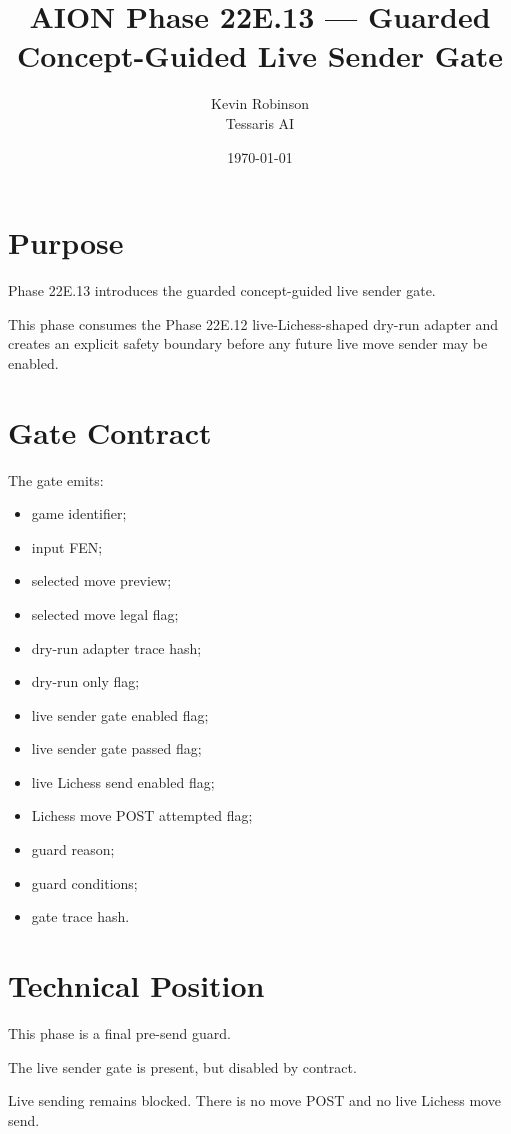 \documentclass[11pt,a4paper]{article}
\title{\textbf{AION Phase 22E.13 --- Guarded Concept-Guided Live Sender Gate}}
\author{Kevin Robinson\\Tessaris AI}
\date{\today}
\begin{document}
\maketitle

\section{Purpose}

Phase 22E.13 introduces the guarded concept-guided live sender gate.

This phase consumes the Phase 22E.12 live-Lichess-shaped dry-run adapter and creates an explicit safety boundary before any future live move sender may be enabled.

\section{Gate Contract}

The gate emits:

\begin{itemize}[leftmargin=*]
  \item game identifier;
  \item input FEN;
  \item selected move preview;
  \item selected move legal flag;
  \item dry-run adapter trace hash;
  \item dry-run only flag;
  \item live sender gate enabled flag;
  \item live sender gate passed flag;
  \item live Lichess send enabled flag;
  \item Lichess move POST attempted flag;
  \item guard reason;
  \item guard conditions;
  \item gate trace hash.
\end{itemize}

\section{Technical Position}

This phase is a final pre-send guard.

The live sender gate is present, but disabled by contract.

Live sending remains blocked. There is no move POST and no live Lichess move send.
\end{document}
